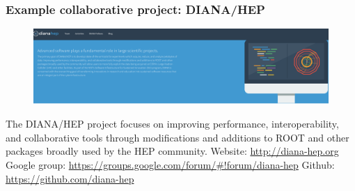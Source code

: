 \begin{frame}
\frametitle{Example collaborative project: DIANA/HEP}

\begin{figure}[htbp]
\begin{center}
\includegraphics[width=1.0\textwidth]{images/diana-hep-webfront.png}
\end{center}
\end{figure}

\small{The DIANA/HEP project focuses on improving performance, interoperability, and collaborative tools through modifications and additions to ROOT and other packages broadly used by the HEP community.}
\vskip 0.15in
\small{Website: \url{http://diana-hep.org}}
\vskip 0.05in
\small{Google group: \url{https://groups.google.com/forum/\#!forum/diana-hep}}
\vskip 0.05in
\small{Github: \url{https://github.com/diana-hep}}

\end{frame}


